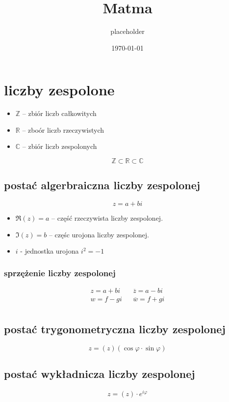 \documentclass[11pt]{article}
\author{placeholder}
\date{\today}
\title{Matma}
\begin{document}
\maketitle
\tableofcontents


\section{liczby zespolone}
\label{sec:org1cd9798}
\begin{itemize}
\item \(\mathbb{Z}\) -- zbiór liczb całkowitych
\item \(\mathbb{R}\) -- zboór liczb rzeczywistych
\item \(\mathbb{C}\) -- zbiór liczb zespolonych
\end{itemize}
$$\mathbb{Z} \subset \mathbb{R} \subset \mathbb{C}$$
\subsection{postać algerbraiczna liczby zespolonej}
\label{sec:orgf690d27}
$$z=a+bi$$

\begin{itemize}
\item \(\Re(z) = a\) -- część rzeczywista liczby zespolonej.
\item \(\Im(z) = b\) -- częśc urojona liczby zespolonej.
\item \(i\) - jednostka urojona \(i^2=-1\)
\end{itemize}
\subsubsection{sprzężenie liczby zespolonej}
\label{sec:org180f9f1}
\begin{latex}
\begin{align*}
  z=a+bi && \overline{z}=a-bi \\
  w=f-gi && \overline{w}=f+gi \\
\end{align*}
\end{latex}

\subsection{postać trygonometryczna liczby zespolonej}
\label{sec:org2fec5ac}
$$z=(z)(\cos\varphi \cdot \sin\varphi)$$
\subsection{postać wykładnicza liczby zespolonej}
\label{sec:orge10d54b}
$$z=(z) \cdot e^{i\varphi}$$
\end{document}

